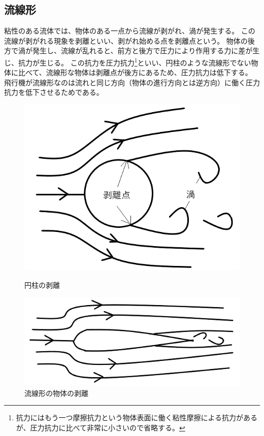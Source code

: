 \documentclass[10pt,b5paper,papersize,dvipdfmx]{jsbook}
\begin{document}
\subsection{流線形}
粘性のある流体では、物体のある一点から流線が剥がれ、渦が発生する。
この流線が剥がれる現象を剥離といい、剥がれ始める点を剥離点という。
物体の後方で渦が発生し、流線が乱れると、前方と後方で圧力により作用する力に差が生じ、抗力が生じる。
この抗力を圧力抗力\footnote{抗力にはもう一つ摩擦抗力という物体表面に働く粘性摩擦による抗力があるが、圧力抗力に比べて非常に小さいので省略する。}といい、円柱のような流線形でない物体に比べて、流線形な物体は剥離点が後方にあるため、圧力抗力は低下する。
飛行機が流線形なのは流れと同じ方向（物体の進行方向とは逆方向）に働く圧力抗力を低下させるためである。
\begin{figure}[ht]
  \captionsetup{margin=0zw} %
  \centering
  \begin{minipage}{0.49\textwidth}
    \includegraphics[width=\textwidth]{img/ryuutai5.png}
    \caption{円柱の剥離}
  \end{minipage}
  \begin{minipage}{0.49\textwidth}
    \includegraphics[width=\textwidth]{img/ryuutai6.png}
    \caption{流線形の物体の剥離}
  \end{minipage}
\end{figure}
\end{document}
